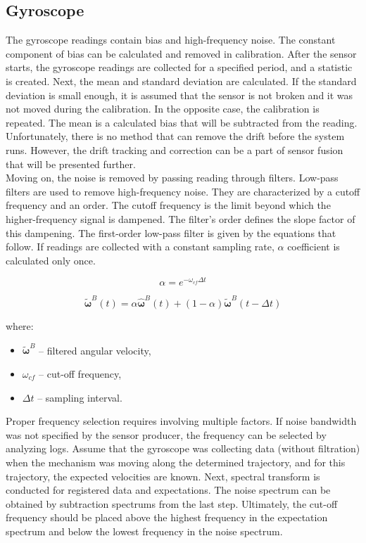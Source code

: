 \subsection{Gyroscope}

The gyroscope readings contain bias and high-frequency noise. The constant component of bias can be calculated and removed in calibration. After the sensor starts, the gyroscope readings are collected for a specified period, and a statistic is created. Next, the mean and standard deviation are calculated. If the standard deviation is small enough, it is assumed that the sensor is not broken and it was not moved during the calibration. In the opposite case, the calibration is repeated. The mean is a calculated bias that will be subtracted from the reading. Unfortunately, there is no method that can remove the drift before the system runs. However, the drift tracking and correction can be a part of sensor fusion that will be presented further.\\

Moving on, the noise is removed by passing reading through filters. Low-pass filters are used to remove high-frequency noise. They are characterized by a cutoff frequency and an order. The cutoff frequency is the limit beyond which the higher-frequency signal is dampened. The filter’s order defines the slope factor of this dampening. The first-order low-pass filter is given by the equations that follow. If readings are collected with a constant sampling rate, $\alpha$ coefficient is calculated only once.

\begin{equation}
	 \alpha = e^{ - \omega_{cf} \varDelta t}
	\label{lpf_alpha}
\end{equation}

\begin{equation}
	\bm{\tilde{\omega}}^B(t) = \alpha  \bm{\hat{\omega}}^B(t) + \left( 1 - \alpha \right) \bm{\tilde{\omega}}^B(t - \varDelta t)
	\label{lpf}
\end{equation}

where:
\begin{itemize}
	\item $\bm{\tilde{\omega}}^B$ -- filtered angular velocity,
	\item $\omega_{cf}$ -- cut-off frequency,
	\item $\varDelta t$ -- sampling interval.
\end{itemize}

Proper frequency selection requires involving multiple factors. If noise bandwidth was not specified by the sensor producer, the frequency can be selected by analyzing logs. Assume that the gyroscope was collecting data (without filtration) when the mechanism was moving along the determined trajectory, and for this trajectory, the expected velocities are known. Next, spectral transform is conducted for registered data and expectations. The noise spectrum can be obtained by subtraction spectrums from the last step. Ultimately, the cut-off frequency should be placed above the highest frequency in the expectation spectrum and below the lowest frequency in the noise spectrum.\\

